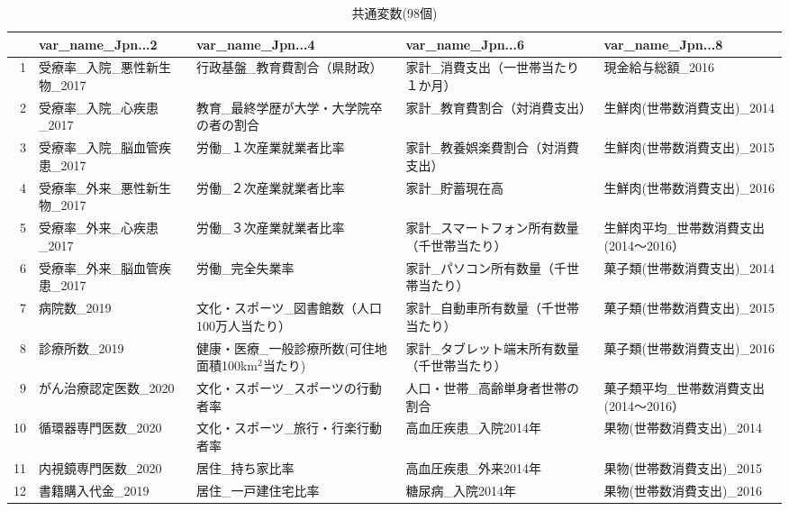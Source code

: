 \begin{table}[ht]
\centering
\caption{共通変数(98個)}
\label{table_commom_d.tex}
\begingroup\tiny

\begin{adjustbox}{width=.5\textwidth}
\begin{tabular}{rllll}
  \hline
 & var\_name\_Jpn...2 & var\_name\_Jpn...4 & var\_name\_Jpn...6 & var\_name\_Jpn...8 \\
  \hline
1 & 受療率\_入院\_悪性新生物\_2017 & 行政基盤\_教育費割合（県財政） & 家計\_消費支出（一世帯当たり１か月） & 現金給与総額\_2016 \\
  2 & 受療率\_入院\_心疾患\_2017 & 教育\_最終学歴が大学・大学院卒の者の割合 & 家計\_教育費割合（対消費支出） & 生鮮肉(世帯数消費支出)\_2014 \\
  3 & 受療率\_入院\_脳血管疾患\_2017 & 労働\_１次産業就業者比率 & 家計\_教養娯楽費割合（対消費支出） & 生鮮肉(世帯数消費支出)\_2015 \\
  4 & 受療率\_外来\_悪性新生物\_2017 & 労働\_２次産業就業者比率 & 家計\_貯蓄現在高 & 生鮮肉(世帯数消費支出)\_2016 \\
  5 & 受療率\_外来\_心疾患\_2017 & 労働\_３次産業就業者比率 & 家計\_スマートフォン所有数量（千世帯当たり） & 生鮮肉平均\_世帯数消費支出(2014〜2016） \\
  6 & 受療率\_外来\_脳血管疾患\_2017 & 労働\_完全失業率 & 家計\_パソコン所有数量（千世帯当たり） & 菓子類(世帯数消費支出)\_2014 \\
  7 & 病院数\_2019 & 文化・スポーツ\_図書館数（人口100万人当たり） & 家計\_自動車所有数量（千世帯当たり） & 菓子類(世帯数消費支出)\_2015 \\
  8 & 診療所数\_2019 & 健康・医療\_一般診療所数(可住地面積100km$^2$当たり) & 家計\_タブレット端末所有数量（千世帯当たり） & 菓子類(世帯数消費支出)\_2016 \\
  9 & がん治療認定医数\_2020 & 文化・スポーツ\_スポーツの行動者率 & 人口・世帯\_高齢単身者世帯の割合 & 菓子類平均\_世帯数消費支出(2014〜2016） \\
  10 & 循環器専門医数\_2020 & 文化・スポーツ\_旅行・行楽行動者率 & 高血圧疾患\_入院2014年 & 果物(世帯数消費支出)\_2014 \\
  11 & 内視鏡専門医数\_2020 & 居住\_持ち家比率 & 高血圧疾患\_外来2014年 & 果物(世帯数消費支出)\_2015 \\
  12 & 書籍購入代金\_2019 & 居住\_一戸建住宅比率 & 糖尿病\_入院2014年 & 果物(世帯数消費支出)\_2016 \\

\end{tabular}
\end{adjustbox}
\end{table}
